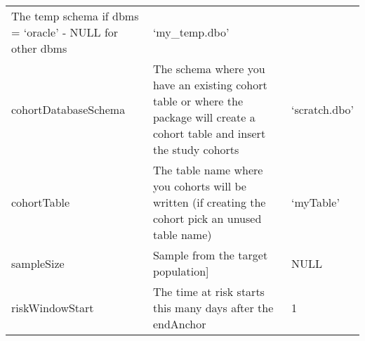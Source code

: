 \documentclass[
]{article}
\begin{document}
\begin{longtable}[]{@{}lll@{}}
\begin{minipage}[t]{0.46\columnwidth}
The temp schema if dbms = `oracle' - NULL for other dbms\strut
\end{minipage} & \begin{minipage}[t]{0.24\columnwidth}\raggedright
`my\_temp.dbo'\strut
\end{minipage}\tabularnewline
\begin{minipage}[t]{0.21\columnwidth}\raggedright
cohortDatabaseSchema\strut
\end{minipage} & \begin{minipage}[t]{0.46\columnwidth}\raggedright
The schema where you have an existing cohort table or where the package
will create a cohort table and insert the study cohorts\strut
\end{minipage} & \begin{minipage}[t]{0.24\columnwidth}\raggedright
`scratch.dbo'\strut
\end{minipage}\tabularnewline
\begin{minipage}[t]{0.21\columnwidth}\raggedright
cohortTable\strut
\end{minipage} & \begin{minipage}[t]{0.46\columnwidth}\raggedright
The table name where you cohorts will be written (if creating the cohort
pick an unused table name)\strut
\end{minipage} & \begin{minipage}[t]{0.24\columnwidth}\raggedright
`myTable'\strut
\end{minipage}\tabularnewline
\begin{minipage}[t]{0.21\columnwidth}\raggedright
sampleSize\strut
\end{minipage} & \begin{minipage}[t]{0.46\columnwidth}\raggedright
Sample from the target population{]}\strut
\end{minipage} & \begin{minipage}[t]{0.24\columnwidth}\raggedright
NULL\strut
\end{minipage}\tabularnewline
\begin{minipage}[t]{0.21\columnwidth}\raggedright
riskWindowStart\strut
\end{minipage} & \begin{minipage}[t]{0.46\columnwidth}\raggedright
The time at risk starts this many days after the endAnchor\strut
\end{minipage} & \begin{minipage}[t]{0.24\columnwidth}\raggedright
1\strut
\end{minipage}\tabularnewline

\end{longtable}
\end{document}
